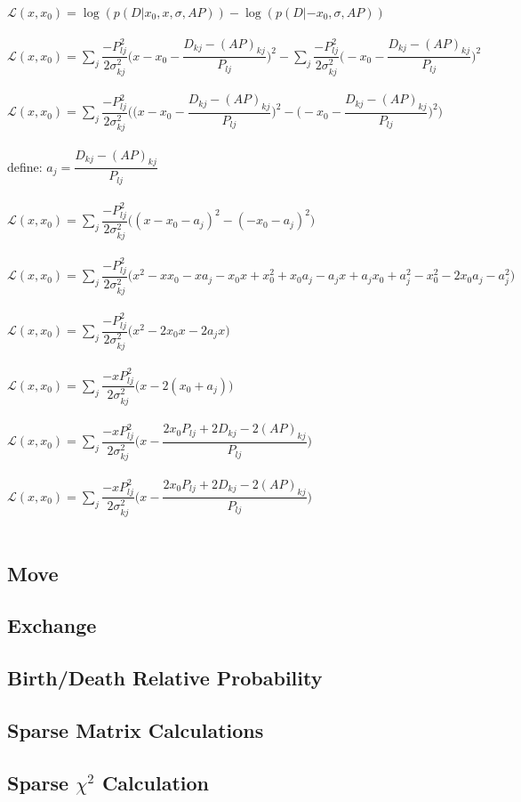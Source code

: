 \documentclass[]{article}
\begin{document}
$\mathcal{L}(x, x_0) = \log(p(D|x_0,x,\sigma,AP)) - \log(p(D|-x_0,\sigma,AP))$\\
\\
$\mathcal{L}(x, x_0) = \sum_j \dfrac{-P_{lj}^2}{2\sigma_{kj}^2}\biggr(x - x_0 - \dfrac{D_{kj} - (AP)_{kj}}{P_{lj}}\biggr)^2 - \sum_j \dfrac{-P_{lj}^2}{2\sigma_{kj}^2}\biggr(-x_0 - \dfrac{D_{kj} - (AP)_{kj}}{P_{lj}}\biggr)^2$\\
\\
$\mathcal{L}(x, x_0) = \sum_j \dfrac{-P_{lj}^2}{2\sigma_{kj}^2}\biggr(\biggr(x - x_0 -  \dfrac{D_{kj} - (AP)_{kj}}{P_{lj}}\biggr)^2 - \biggr(-x_0 - \dfrac{D_{kj} - (AP)_{kj}}{P_{lj}}\biggr)^2\biggr)$\\
\\
define: $a_j = \dfrac{D_{kj} - (AP)_{kj}}{P_{lj}}$\\
\\
$\mathcal{L}(x, x_0) = \sum_j \dfrac{-P_{lj}^2}{2\sigma_{kj}^2}\biggr((x - x_0 - a_j)^2 - (-x_0 - a_j)^2\biggr)$\\
\\
$\mathcal{L}(x, x_0) = \sum_j\dfrac{-P_{lj}^2}{2\sigma_{kj}^2}\biggr(x^2 - xx_0 - xa_j - x_0x + x_0^2 + x_0a_j - a_jx + a_jx_0 + a_j^2 - x_0^2 - 2x_0a_j - a_j^2\biggr)$\\
\\
$\mathcal{L}(x, x_0) = \sum_j\dfrac{-P_{lj}^2}{2\sigma_{kj}^2}\biggr(x^2 - 2x_0x - 2a_jx\biggr)$\\
\\
$\mathcal{L}(x, x_0) = \sum_j\dfrac{-xP_{lj}^2}{2\sigma_{kj}^2}\biggr(x - 2(x_0 + a_j)\biggr)$\\
\\
$\mathcal{L}(x, x_0) = \sum_j\dfrac{-xP_{lj}^2}{2\sigma_{kj}^2}\biggr(x - \dfrac{2x_0P_{lj} + 2D_{kj} - 2(AP)_{kj}}{P_{lj}}\biggr)$\\
\\
$\mathcal{L}(x, x_0) = \sum_j\dfrac{-xP_{lj}^2}{2\sigma_{kj}^2}\biggr(x - \dfrac{2x_0P_{lj} + 2D_{kj} - 2(AP)_{kj}}{P_{lj}}\biggr)$\\
\\
\subsection{Move}

\subsection{Exchange}

\subsection{Birth/Death Relative Probability}

\subsection{Sparse Matrix Calculations}

\subsection{Sparse $\chi^2$ Calculation}
\end{document}
